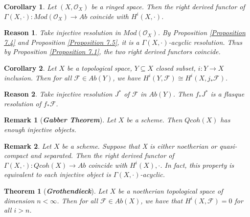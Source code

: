 \documentclass{ctexart}
\newtheorem{remark}{Remark}[section]
\newtheorem{theorem}{Theorem}[section]
\newtheorem{reason}{Reason}[section]
\newtheorem{corollary}{Corollary}[section]
\begin{document}
\begin{corollary}
    Let $(X, \mathcal{O}_{X})$ be a ringed space.
    Then the right derived functor of $\Gamma(X, \cdot): Mod(\mathcal{O}_{X}) \longrightarrow Ab$ coincide with $H^{i}(X, \cdot)$.
    \label{Corollary 7.2}
\end{corollary}
\begin{reason}
    Take injective resolution in $Mod(\mathcal{O}_{X})$.
    By Proposition \ref{Proposition 7.4} and Proposition \ref{Proposition 7.5}, it is a $\Gamma(X, \cdot)$-acyclic resolution.
    Thus by Proposition \ref{Proposition 7.1}, the two right derived functors coincide.
\end{reason}
\begin{corollary}
    Let $X$ be a topological space, $Y \subseteq X$ closed subset, $i: Y \longrightarrow X$ inclusion.
    Then for all $\mathcal{F}\in Ab(Y)$, we have $H^{i}(Y, \mathcal{F}) \cong H^{i}(X, j_{\ast}\mathcal{F})$.
    \label{Corollary 7.3}
\end{corollary}
\begin{reason}
    Take injective resolution $J^{\ast}$ of $\mathcal{F}$ in $Ab(Y)$.
    Then $f_{\ast}J^{\ast}$ is a flasque resolution of $f_{\ast}\mathcal{F}$.
\end{reason}
\begin{remark}[\textbf{\emph{Gabber Theorem}}]
    Let $X$ be a scheme.
    Then $Qcoh(X)$ has enough injective objects.
\end{remark}
\begin{remark}
    Let $X$ be a scheme.
    Suppose that X is either noetherian or quasi-compact and separated.
    Then the right derived functor of $\Gamma(X, \cdot): Qcoh(X) \longrightarrow Ab$ coincide with $H^{i}(X), \cdot$.
    In fact, this property is equivalent to each injective object is $\Gamma(X, \cdot)$-acyclic.
\end{remark}
\begin{theorem}[\textbf{\emph{Grothendieck}}]
    Let $X$ be a noetherian topological space of dimension $n < \infty$.
    Then for all $\mathcal{F}\in Ab(X)$, we have that $H^{i}(X, \mathcal{F}) = 0$ for all $i > n$.
    \label{Theorem 7.1}
\end{theorem}
\end{document}
